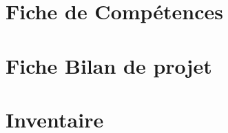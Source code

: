 \documentclass[asi]{picInsa}
\begin{document}
\begin{appendix}
\chapter{Fiche de Compétences}
\label{annexeFC}


\chapter{Fiche Bilan de projet}


\chapter{Inventaire}
\label{annexeInventaire}

	
\listoffigures
{}
	 
\listoftables
{}
\end{appendix}
\pageQuatriemeCouverture
\end{document}

